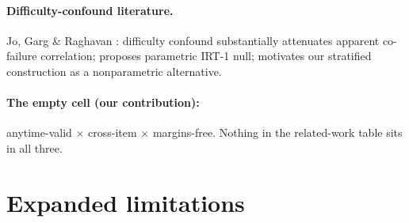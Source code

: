 \documentclass{article}
\begin{document}
\paragraph{Difficulty-confound literature.}
Jo, Garg \& Raghavan \citep{jo2602}: difficulty confound substantially attenuates
apparent co-failure correlation; proposes parametric IRT-1 null; motivates our
stratified construction as a nonparametric alternative.

\paragraph{The empty cell (our contribution):}
anytime-valid $\times$ cross-item $\times$ margins-free. Nothing in the
related-work table sits in all three.


\section{Expanded limitations}
\label{app:limitations}
\end{document}
